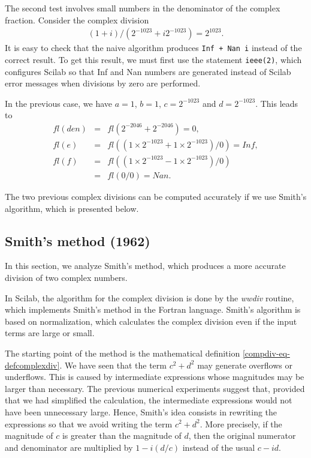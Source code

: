 \documentclass{paper}
\newcommand{\scifun}[1]{\texttt{#1}}
\newcommand{\scivar}[1]{\texttt{#1}}
\begin{document}
The second test involves small numbers in the denominator of the complex fraction.
Consider the complex division 
\begin{eqnarray}
\label{eq-cd-thirdtest}
(1 + i)/(2^{-1023} +  i 2^{-1023})= 2^{1023}.
\end{eqnarray}
It is easy to check that the naive algorithm produces \scivar{Inf + Nan i} instead 
of the correct result. 
To get this result, we must first use the statement \scifun{ieee(2)}, which configures 
Scilab so that Inf and Nan numbers are generated instead 
of Scilab error messages when divisions by zero are performed. 

In the previous case, we have $a=1$, $b=1$, $c=2^{-1023}$ and $d=2^{-1023}$.
This leads to
\begin{eqnarray}
fl(den) 
&=& fl(2^{-2046} + 2^{-2046})  = 0, \nonumber \\
fl(e) 
&=& fl((1\times 2^{-1023} + 1\times 2^{-1023})/0) = Inf,  \nonumber \\
fl(f) 
&=& fl((1\times 2^{-1023} - 1\times 2^{-1023})/0)  \nonumber \\
&=& fl(0/0) = Nan. \nonumber
\end{eqnarray}

The two previous complex divisions can be computed accurately if we use 
Smith's algorithm, which is presented below.


\subsection{Smith's method (1962)}

In this section, we analyze Smith's method, which produces a more accurate 
division of two complex numbers. 

In Scilab, the algorithm for the complex 
division is done by the \emph{wwdiv} routine, which implements  
Smith's method \cite{Smith1962} in the Fortran language.
Smith's algorithm is based on normalization, which calculates the complex 
division even if the input terms are large or small. 

The starting point of the method is the mathematical definition \ref{compdiv-eq-defcomplexdiv}.
We have seen that the term $c^2 + d^2$ may generate overflows or underflows.
This is caused by intermediate expressions whose magnitudes may be larger than necessary.
The previous numerical experiments suggest that, provided that we 
had simplified the calculation, the intermediate expressions 
would not have been unnecessary large. 
Hence, Smith's idea consists in rewriting the expressions 
so that we avoid writing the term $c^2 + d^2$.
More precisely, if the magnitude of $c$ is greater than the magnitude of $d$, 
then the original numerator and denominator are multiplied 
by $1 - i(d/c)$ instead of the usual $c - id$.
\end{document}

